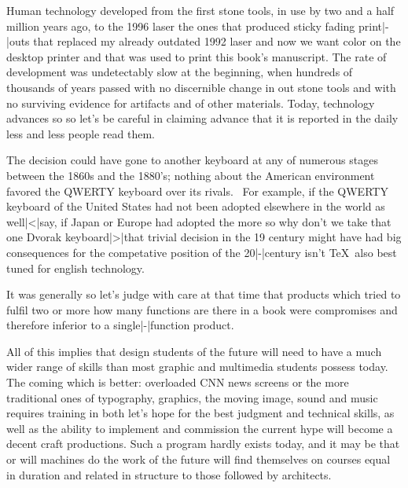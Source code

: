 Human technology developed from the first stone tools, in use by two and a half
million years ago, to the 1996 laser  {the ones that produced
sticky fading print|-|outs} that replaced my already outdated 1992 \remark
{laser} {and now we want color on the desktop} printer and that was used to print
this book's manuscript. The rate of development was undetectably slow at the
beginning, when hundreds of thousands of years passed with no discernible change
in out stone tools and with no surviving evidence for artifacts and of other
materials. Today, technology advances so  {so let's be careful
in claiming advance} that it is reported in the daily  {less
and less people read them}.

\StopIdea

\StartIdea
    [ title={Jared Diamond},
     remark={Guns, Germs and Steel, A Short History of Everybody for the Last
             13,000 years, p. 418, 1997}]

The decision could have gone to another keyboard at any of numerous stages
between the 1860s and the 1880's; nothing about the American environment favored
the \hbox {QWERTY} keyboard over its rivals. \unknown\ For example, if the \hbox
{QWERTY} keyboard of the United States had not been adopted elsewhere in the
world as well|<|say, if Japan or Europe had adopted the more 
{so why don't we take that one} Dvorak keyboard|>|that trivial decision in the
19 century might have had big consequences for the competative position
of the 20|-|century  {isn't \TeX\ also best tuned for
english} technology.

\StopIdea

\StartIdea
    [ title={Peter Wilbur \& Michael Burke},
     remark={Information Graphics, Innovative Solutions in Contemporary Design,
             p. 87, 1998}]

It was generally  {so let's judge with care} at that time that
products which tried to fulfil two or more  {how many
functions are there in a book} were compromises and therefore inferior to a
single|-|function product.

\StopIdea

\StartIdea
    [ title={Peter Wilbur \& Michael Burke},
     remark={Information Graphics, Innovative Solutions in Contemporary Design,
             p. 17, 1998}]

All of this implies that design students of the future will need to have a much
wider range of skills than most graphic and multimedia students possess today.
The coming  {which is better: overloaded CNN news screens or
the more traditional ones} of typography, graphics, the moving image, sound and
music requires training in both  {let's hope for the best}
judgment and technical skills, as well as the ability to implement and commission
 {the current hype will become a decent craft} productions.
Such a program hardly exists today, and it may be that  {or
will machines do the work} of the future will find themselves on courses equal in
duration and related in structure to those followed by architects.

